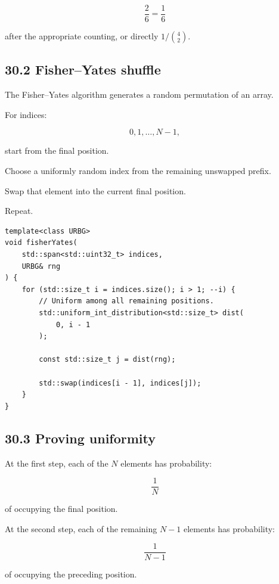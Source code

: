 \[ \frac26=\frac16 \]

after the appropriate counting, or directly \(1/\binom42\).

\subsection{30.2 Fisher--Yates shuffle}\label{02-foundations-ii-ch031-fisheryates-shuffle}

\hypertarget{02-foundations-ii-ch031-fisheryates-shuffle}{}

The Fisher--Yates algorithm generates a random permutation of an array.

For indices:

\[ 0,1,\ldots,N-1, \]

start from the final position.

Choose a uniformly random index from the remaining unswapped prefix.

Swap that element into the current final position.

Repeat.

\begin{verbatim}
template<class URBG>
void fisherYates(
    std::span<std::uint32_t> indices,
    URBG& rng
) {
    for (std::size_t i = indices.size(); i > 1; --i) {
        // Uniform among all remaining positions.
        std::uniform_int_distribution<std::size_t> dist(
            0, i - 1
        );

        const std::size_t j = dist(rng);

        std::swap(indices[i - 1], indices[j]);
    }
}
\end{verbatim}

\subsection{30.3 Proving uniformity}\label{02-foundations-ii-ch031-proving-uniformity}

\hypertarget{02-foundations-ii-ch031-proving-uniformity}{}

At the first step, each of the \(N\) elements has probability:

\[ \frac1N \]

of occupying the final position.

At the second step, each of the remaining \(N-1\) elements has probability:

\[ \frac1{N-1} \]

of occupying the preceding position.


